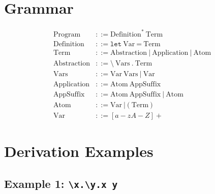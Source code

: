 \documentclass{article}
\begin{document}
\section{Grammar}
\begin{align*}
\text{Program}     &::= \text{Definition}^*\ \text{Term} \\
\text{Definition}  &::= \texttt{let}\ \text{Var}\ \texttt{=}\ \text{Term} \\
\text{Term}        &::= \text{Abstraction}\ |\ \text{Application}\ |\ \text{Atom} \\
\text{Abstraction} &::= \texttt{\textbackslash}\ \text{Vars}\ \texttt{.}\ \text{Term} \\
\text{Vars}        &::= \text{Var}\ \text{Vars}\ |\ \text{Var} \\
\text{Application} &::= \text{Atom}\ \text{AppSuffix} \\
\text{AppSuffix}   &::= \text{Atom}\ \text{AppSuffix}\ |\ \text{Atom} \\
\text{Atom}        &::= \text{Var}\ |\ \texttt{(}\ \text{Term}\ \texttt{)} \\
\text{Var}         &::= [a-zA-Z]+
\end{align*}

\section{Derivation Examples}

\subsection{Example 1: \texttt{\textbackslash x.\textbackslash y.x y}}
\end{document}
